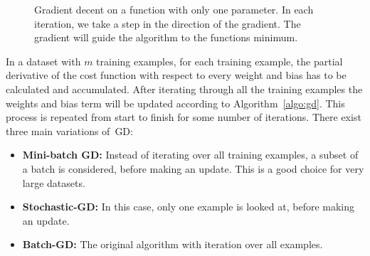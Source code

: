 \begin{figure}
\centering 
\resizebox{0.65\textwidth}{0.4\textwidth}{      

}
\caption{Gradient decent on a function with only one parameter. In each iteration, we take a step in the direction of the gradient. The gradient will guide the algorithm to the functions minimum. }
\label{fig:gradientD}
\end{figure}
\noindent
In a dataset with $m$ training examples, for each training example, the partial derivative of the cost function with respect to every weight and bias has to be calculated and accumulated. After iterating through all the training examples the weights and bias term will be updated according to Algorithm~\ref{algo:gd}. This process is repeated from start to finish for some number of iterations. There exist three main variations of~GD: 
\begin{itemize}
\item \textbf{Mini-batch GD: } Instead of iterating over all training examples, a subset of a batch is considered, before making an update. This is a good choice for very large datasets.
\item \textbf{Stochastic-GD: } In this case, only one example is looked at, before making an update. 
\item \textbf{Batch-GD: } The original algorithm with iteration over all examples. 
\end{itemize}

